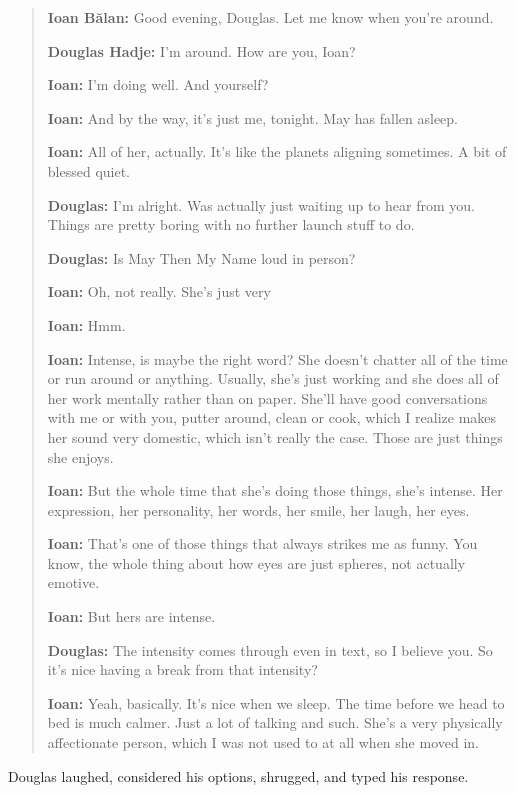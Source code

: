 \begin{quote}
\textbf{Ioan Bălan:} Good evening, Douglas. Let me know when you're around.

\textbf{Douglas Hadje:} I'm around. How are you, Ioan?

\textbf{Ioan:} I'm doing well. And yourself?

\textbf{Ioan:} And by the way, it's just me, tonight. May has fallen asleep.

\textbf{Ioan:} All of her, actually. It's like the planets aligning sometimes. A bit of blessed quiet.

\textbf{Douglas:} I'm alright. Was actually just waiting up to hear from you. Things are pretty boring with no further launch stuff to do.

\textbf{Douglas:} Is May Then My Name loud in person?

\textbf{Ioan:} Oh, not really. She's just very

\textbf{Ioan:} Hmm.

\textbf{Ioan:} Intense, is maybe the right word? She doesn't chatter all of the time or run around or anything. Usually, she's just working and she does all of her work mentally rather than on paper. She'll have good conversations with me or with you, putter around, clean or cook, which I realize makes her sound very domestic, which isn't really the case. Those are just things she enjoys.

\textbf{Ioan:} But the whole time that she's doing those things, she's intense. Her expression, her personality, her words, her smile, her laugh, her eyes.

\textbf{Ioan:} That's one of those things that always strikes me as funny. You know, the whole thing about how eyes are just spheres, not actually emotive.

\textbf{Ioan:} But hers are intense.

\textbf{Douglas:} The intensity comes through even in text, so I believe you. So it's nice having a break from that intensity?

\textbf{Ioan:} Yeah, basically. It's nice when we sleep. The time before we head to bed is much calmer. Just a lot of talking and such. She's a very physically affectionate person, which I was not used to at all when she moved in.
\end{quote}

\noindent Douglas laughed, considered his options, shrugged, and typed his response.

